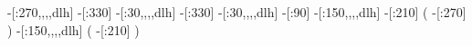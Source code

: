     -[:270,,,,dlh]%
           -[:330]%
     -[:30,,,,dlh]%
           -[:330]%
     -[:30,,,,dlh]%
            -[:90]%
    -[:150,,,,dlh]%
           -[:210]%
                     (
               -[:270]%
                     )
    -[:150,,,,dlh]%
                     (
               -[:210]%
                     )